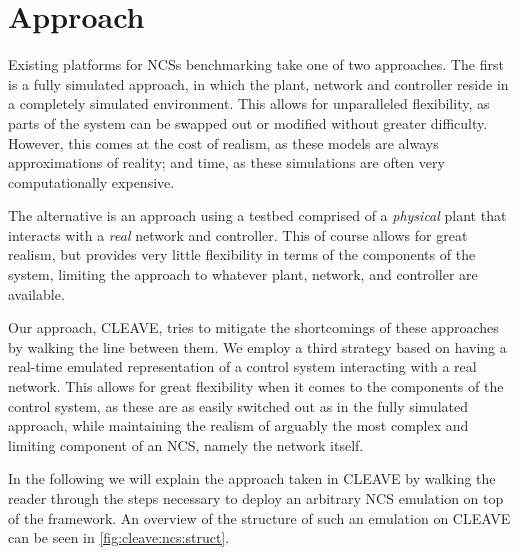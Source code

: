 \section{Approach}

Existing platforms for \acp{NCS} benchmarking take one of two approaches.
The first is a fully simulated approach, in which the plant, network and controller reside in a completely simulated environment.
This allows for unparalleled flexibility, as parts of the system can be swapped out or modified without greater difficulty.
However, this comes at the cost of realism, as these models are always approximations of reality; and time, as these simulations are often very computationally expensive.

The alternative is an approach using a testbed comprised of a \emph{physical} plant that interacts with a \emph{real} network and controller.
This of course allows for great realism, but provides very little flexibility in terms of the components of the system, limiting the approach to whatever plant, network, and controller are available.

Our approach, CLEAVE, tries to mitigate the shortcomings of these approaches by walking the line between them.
We employ a third strategy based on having a real-time emulated representation of a control system interacting with a real network.
This allows for great flexibility when it comes to the components of the control system, as these are as easily switched out as in the fully simulated approach, while maintaining the realism of arguably the most complex and limiting component of an \ac{NCS}, namely the network itself.

In the following we will explain the approach taken in CLEAVE by walking the reader through the steps necessary to deploy an arbitrary \ac{NCS} emulation on top of the framework.
An overview of the structure of such an emulation on CLEAVE can be seen in \cref{fig:cleave:ncs:struct}.

